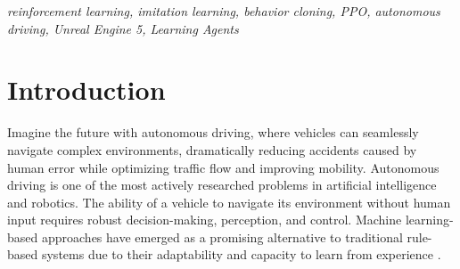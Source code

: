 \documentclass[conference]{IEEEtran}
\begin{document}
\begin{abstract}
Autonomous driving research has made significant advances through the application of machine learning techniques, particularly Reinforcement Learning and Imitation Learning. This paper presents a comparative study of two self-learning agent paradigms implemented within Unreal Engine 5 using the Learning Agents plugin: Proximal Policy Optimization, a policy-gradient RL algorithm, and Behavior Cloning, a supervised IL method. Both agents are trained and evaluated on the same autonomous driving track to ensure a fair comparison. Performance metrics, including cumulative reward, lap completion rate, and convergence speed, are recorded across training episodes. Experimental results indicate that BC achieves higher initial performance due to expert demonstration data, while PPO surpasses BC in long-term performance and generalization to unseen track configurations. This study demonstrates the viability of Unreal Engine 5 (UE5) as a simulation platform for machine learning research and presents an analysis of the trade-offs between Reinforcement Learning (RL) and Imitation Learning (IL) paradigms for autonomous driving tasks.
\end{abstract}

\begin{IEEEkeywords}
\textit{
reinforcement learning, imitation learning, behavior cloning, PPO, autonomous driving, Unreal Engine 5, Learning Agents
}
\end{IEEEkeywords}

\section{Introduction} \label{sec:introduction}

Imagine the future with autonomous driving, where vehicles can seamlessly navigate complex environments, dramatically reducing accidents caused by human error while optimizing traffic flow and improving mobility. Autonomous driving is one of the most actively researched problems in artificial intelligence and robotics. The ability of a vehicle to navigate its environment without human input requires robust decision-making, perception, and control. Machine learning-based approaches have emerged as a promising alternative to traditional rule-based systems due to their adaptability and capacity to learn from experience \cite{sutton2018reinforcement}.
\end{document}
